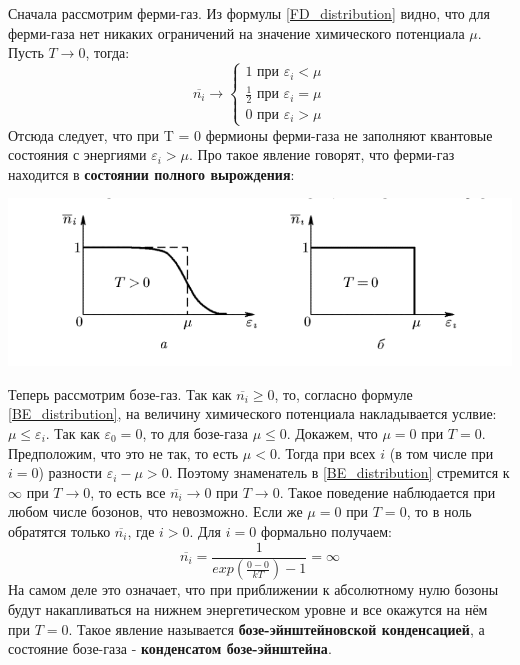 \documentclass[A4]{article}
\begin{document}
    Сначала рассмотрим ферми-газ. Из формулы \eqref{FD_distribution} видно, что для ферми-газа нет
    никаких ограничений на значение химического потенциала $\mu$. Пусть $T \longrightarrow 0$, тогда:
    \begin{equation*}
    \overline{n_i} \longrightarrow
        \begin{cases}
            1 \text{ при } \varepsilon_i < \mu    \\
            \frac{1}{2} \text{ при } \varepsilon_i = \mu  \\
            0 \text{ при } \varepsilon_i > \mu
        \end{cases}
    \end{equation*}
    Отсюда следует, что при T = 0 фермионы ферми-газа не заполняют квантовые состояния с энергиями
    $\varepsilon_i > \mu$. Про такое явление говорят, что ферми-газ находится в
    \textbf{состоянии полного вырождения}:

    \begin{center}
        \includegraphics[width = \textwidth]{graph.png}
    \end{center}

    Теперь рассмотрим бозе-газ. Так как $\overline{n_i} \geq 0$, то, согласно формуле
    \eqref{BE_distribution}, на величину химического потенциала накладывается услвие:
    $\mu \leq \varepsilon_i$. Так как $\varepsilon_0 = 0$, то для бозе-газа $\mu \leq 0$.
    Докажем, что $\mu = 0$ при $T = 0$. Предположим, что это не так, то есть $\mu < 0$.
    Тогда при всех $i$ (в том числе при $i = 0$) разности $\varepsilon_i - \mu > 0$.
    Поэтому знаменатель в \eqref{BE_distribution} стремится к $\infty$ при $T \longrightarrow 0$,
    то есть все $\overline{n_i}\longrightarrow 0 \text{ при } T\longrightarrow 0$.
    Такое поведение наблюдается при любом числе бозонов, что невозможно. Если же $\mu = 0$ при
    $T = 0$, то в ноль обратятся только $\overline{n_i}$, где $i > 0$. Для $i = 0$ формально получаем:
    \begin{equation*}
        \overline{n_i} = \frac{1}{exp\left(\frac{0 - 0}{kT}\right) - 1} = \infty
    \end{equation*}
    На самом деле это означает, что при приближении к абсолютному нулю бозоны будут накапливаться
    на нижнем энергетическом уровне и все окажутся на нём при $T = 0$. Такое явление называется
    \textbf{бозе-эйнштейновской конденсацией}, а состояние бозе-газа - \textbf{конденсатом бозе-эйнштейна}.
\end{document}
